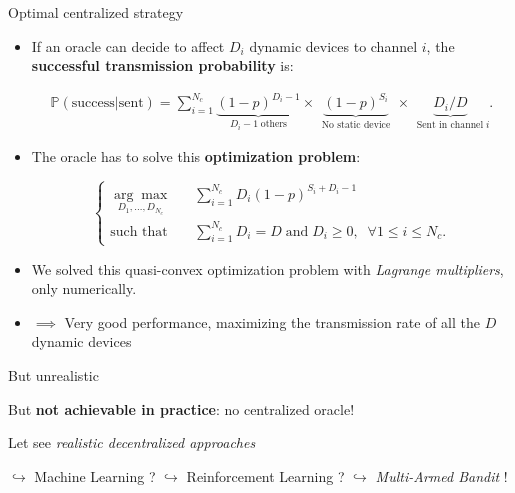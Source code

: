 \documentclass[12pt,english,ignorenonframetext,aspectratio=169,]{beamer}
\providecommand{\tightlist}{%
  \setlength{\itemsep}{0pt}\setlength{\parskip}{0pt}}
\begin{document}
\begin{frame}[allowframebreaks]{Optimal centralized strategy}

\begin{itemize}
\tightlist
\item
  If an oracle can decide to affect \(D_i\) dynamic devices to channel
  \(i\), the \textbf{successful transmission probability} is:
  \vspace*{-10pt}

  \begin{small} \begin{align*}
  \mathbb{P}(\text{success}|\text{sent}) = \sum_{i=1}^{N_c} \underbrace{(1 - p)^{D_i - 1}}_{\;\;D_i - 1 \;\text{others}\;\;} \times \underbrace{(1 - p)^{S_i}}_{\;\;\text{No static device}\;\;} \times \underbrace{ D_i / D }_{\;\;\text{Sent in channel}\; i}.
  \end{align*} \end{small}
\item
  The oracle has to solve this \textbf{optimization problem}:
  \vspace*{-5pt}

  \begin{small} \begin{equation*} \begin{cases}
  \underset{D_1,\dots,D_{N_c}}{\arg\max}\;\;\; & \sum_{i=1}^{N_c} D_i (1 - p)^{S_i + D_i -1}\\
  \text{such that}\;\;\; & \sum_{i=1}^{N_c} D_i = D \; \text{and} \; D_i \geq 0, \; \; \forall 1 \leq i \leq N_c .
  \end{cases} \end{equation*} \end{small}
\item
  We solved this quasi-convex optimization problem with \emph{Lagrange
  multipliers}, only numerically.
\item
  \(\implies\) Very good performance, maximizing the transmission rate
  of all the \(D\) dynamic devices
\end{itemize}

\begin{block}{But unrealistic}

But \textbf{not achievable in practice}: no centralized oracle!

\end{block}

\begin{block}{Let see \emph{realistic decentralized approaches}}

\(\hookrightarrow\) Machine Learning ? \newline
\hspace*{15pt}\(\hookrightarrow\) Reinforcement Learning ? \newline
\hspace*{30pt} \(\hookrightarrow\) \emph{Multi-Armed Bandit} !

\end{block}

\end{frame}
\end{document}
